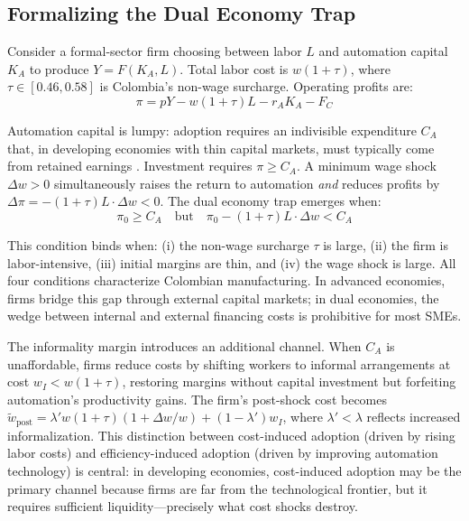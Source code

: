 \documentclass[a4paper,fleqn]{cas-sc}
\begin{document}
\subsection{Formalizing the Dual Economy Trap}
\label{subsec:formal_trap}

Consider a formal-sector firm choosing between labor $L$ and automation capital $K_A$ to produce $Y = F(K_A, L)$. Total labor cost is $w(1 + \tau)$, where $\tau \in [0.46, 0.58]$ is Colombia's non-wage surcharge. Operating profits are:
\begin{equation}
\label{eq:profits}
\pi = pY - w(1+\tau)L - r_A K_A - F_C
\end{equation}

Automation capital is lumpy: adoption requires an indivisible expenditure $C_A$ that, in developing economies with thin capital markets, must typically come from retained earnings \citep{busso2020}. Investment requires $\pi \geq C_A$. A minimum wage shock $\Delta w > 0$ simultaneously raises the return to automation \emph{and} reduces profits by $\Delta \pi = -(1+\tau) L \cdot \Delta w < 0$. The dual economy trap emerges when:
\begin{equation}
\label{eq:trap_condition}
\pi_0 \geq C_A \quad \text{but} \quad \pi_0 - (1+\tau)L \cdot \Delta w < C_A
\end{equation}

This condition binds when: (i) the non-wage surcharge $\tau$ is large, (ii) the firm is labor-intensive, (iii) initial margins are thin, and (iv) the wage shock is large. All four conditions characterize Colombian manufacturing. In advanced economies, firms bridge this gap through external capital markets; in dual economies, the wedge between internal and external financing costs is prohibitive for most SMEs.

The informality margin introduces an additional channel. When $C_A$ is unaffordable, firms reduce costs by shifting workers to informal arrangements at cost $w_I < w(1+\tau)$, restoring margins without capital investment but forfeiting automation's productivity gains. The firm's post-shock cost becomes $\tilde{w}_{\text{post}} = \lambda' w(1+\tau)(1 + \Delta w/w) + (1-\lambda') w_I$, where $\lambda' < \lambda$ reflects increased informalization. This distinction between cost-induced adoption (driven by rising labor costs) and efficiency-induced adoption (driven by improving automation technology) is central: in developing economies, cost-induced adoption may be the primary channel because firms are far from the technological frontier, but it requires sufficient liquidity---precisely what cost shocks destroy.
\end{document}
